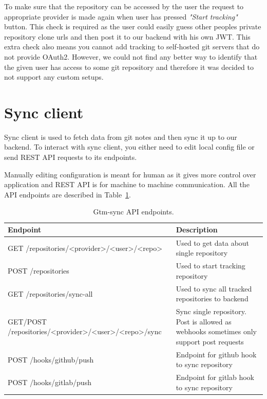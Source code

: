 To make sure that the repository can be accessed by the user the request to appropriate provider is made again
when user has pressed \textit{"Start tracking"} button.
This check is required as the user could easily guess other peoples private repository clone urls and then post
it to our backend with his own JWT.
This extra check also means you cannot add tracking to self-hosted git servers that do not provide OAuth2.
However, we could not find any better way to identify that the given user has access to some git repository and
therefore it was decided to not support any custom setups.

\section{Sync client}\label{sec:sync-client-content}
Sync client is used to fetch data from git notes and then sync it up to our backend.
To interact with sync client, you either need to edit local config file or send REST API requests to its endpoints.

Manually editing configuration is meant for human as it gives more control over application and REST API is
for machine to machine communication.
All the API endpoints are described in Table~\ref{tab:gtm-sync-endpoints}.

\begin{table}[H]
    \centering
    \begin{tabular}{ | p{8cm} | p{6cm} |}
        \hline
        Endpoint & Description\\
        \hline
        GET /repositories/<provider>/<user>/<repo> & Used to get data about single repository \\
        \hline
        POST /repositories & Used to start tracking repository\\
        \hline
        GET /repositories/sync-all & Used to sync all tracked repositories to backend\\
        \hline
        GET/POST /repositories/<provider>/<user>/<repo>/sync & Sync single repository.
        Post is allowed as webhooks sometimes only support post requests\\
        \hline
        POST /hooks/github/push & Endpoint for github hook to sync repository\\
        \hline
        POST /hooks/gitlab/push & Endpoint for gitlab hook to sync repository\\
        \hline
    \end{tabular}
    \caption{Gtm-sync API endpoints.}
    \label{tab:gtm-sync-endpoints}
\end{table}

